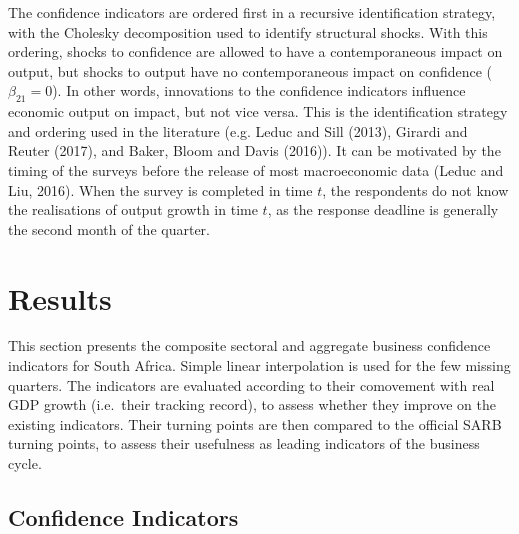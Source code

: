 \documentclass[11pt,]{article}
\begin{document}
The confidence indicators are ordered first in a recursive
identification strategy, with the Cholesky decomposition used to
identify structural shocks. With this ordering, shocks to confidence are
allowed to have a contemporaneous impact on output, but shocks to output
have no contemporaneous impact on confidence (\(\beta_{21} = 0\)). In
other words, innovations to the confidence indicators influence economic
output on impact, but not vice versa. This is the identification
strategy and ordering used in the literature (e.g. Leduc and Sill
(2013), Girardi and Reuter (2017), and Baker, Bloom and Davis (2016)).
It can be motivated by the timing of the surveys before the release of
most macroeconomic data (Leduc and Liu, 2016). When the survey is
completed in time \(t\), the respondents do not know the realisations of
output growth in time \(t\), as the response deadline is generally the
second month of the quarter.

\section{Results}\label{results}

This section presents the composite sectoral and aggregate business
confidence indicators for South Africa. Simple linear interpolation is
used for the few missing quarters. The indicators are evaluated
according to their comovement with real GDP growth (i.e.~their tracking
record), to assess whether they improve on the existing indicators.
Their turning points are then compared to the official SARB turning
points, to assess their usefulness as leading indicators of the business
cycle.

\subsection{Confidence Indicators}\label{confidence-indicators}
\end{document}
